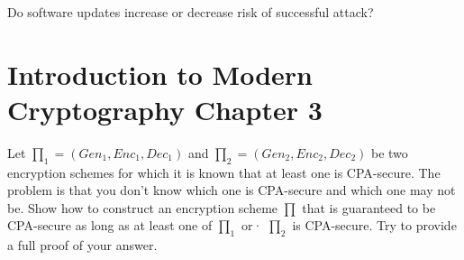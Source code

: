 \documentclass{supervision}
\begin{document}
\begin{questions}
    \question Do software updates increase or decrease risk of successful
      attack?

    \section*{Introduction to Modern Cryptography Chapter 3}
    \question Let $\prod_1 = ({Gen}_1, {Enc}_1, {Dec}_1)$ and $\prod_2 =
      ({Gen}_2, {Enc}_2, {Dec}_2)$ be two encryption schemes for which it is
      known that at least one is CPA-secure. The problem is that you don't know
      which one is CPA-secure and which one may not be. Show how to construct an
      encryption scheme $\prod$ that is guaranteed to be CPA-secure as long as
      at least one of $\prod_1$ or· $\prod_2$ is CPA-secure. Try to provide a
      full proof of your answer.


  \end{questions}
\end{document}
